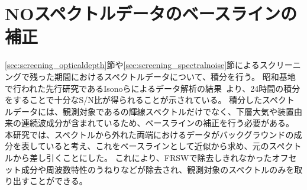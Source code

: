 \section{NOスペクトルデータのベースラインの補正}
\label{sec:correction_baselinefitting}
\ref{sec:screening_opticaldepth}節や\ref{sec:screening_spectralnoise}節によるスクリーニングで残った期間におけるスペクトルデータについて、積分を行う。
昭和基地で行われた先行研究であるIsonoらによるデータ解析の結果~\cite{isono2014ground}より、24時間の積分をすることで十分なS/N比が得られることが示されている。
積分したスペクトルデータには、観測対象であるの輝線スペクトルだけでなく、下層大気や装置由来の連続波成分が含まれているため、ベースラインの補正を行う必要がある。
本研究では、スペクトルから外れた両端におけるデータがバックグラウンドの成分を表していると考え、これをベースラインとして近似から求め、元のスペクトルから差し引くことにした。
これにより、FRSWで除去しきれなかったオフセット成分や周波数特性のうねりなどが除去され、観測対象のスペクトルのみを取り出すことができる。\par

